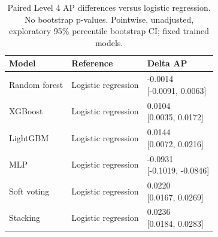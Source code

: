 \begin{table}[htbp]
\centering
\small
\caption{Paired Level 4 AP differences versus logistic regression. No bootstrap p-values. Pointwise, unadjusted, exploratory 95\% percentile bootstrap CI; fixed trained models.}
\label{tab:ap-vs-lr-level4}
\begin{tabular}{lll}
\toprule
Model & Reference & Delta AP \\
\midrule
Random forest & Logistic regression & \shortstack{{-0.0014} \\ {[-0.0091, 0.0063]}} \\
XGBoost & Logistic regression & \shortstack{{0.0104} \\ {[0.0035, 0.0172]}} \\
LightGBM & Logistic regression & \shortstack{{0.0144} \\ {[0.0072, 0.0216]}} \\
MLP & Logistic regression & \shortstack{{-0.0931} \\ {[-0.1019, -0.0846]}} \\
Soft voting & Logistic regression & \shortstack{{0.0220} \\ {[0.0167, 0.0269]}} \\
Stacking & Logistic regression & \shortstack{{0.0236} \\ {[0.0184, 0.0283]}} \\
\bottomrule
\end{tabular}
\end{table}

